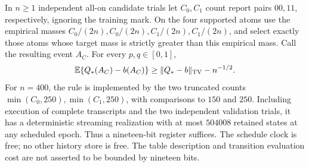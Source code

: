 \begin{lemma}
\label{lem:v19-counter}
In $n\ge1$ independent all-on candidate trials let $C_0,C_1$ count report
pairs $00,11$, respectively, ignoring the training mark. On the four
supported atoms use the empirical masses
$C_0/(2n),C_0/(2n),C_1/(2n),C_1/(2n)$, and select exactly those atoms
whose target mass is strictly greater than this empirical mass. Call the
resulting event $A_C$. For every $p,q\in[0,1]$,
\begin{equation}\label{eq:v19-countregret}
 \mathbb E\{Q_*(A_C)-b(A_C)\}\ge\|Q_*-b\|_{\rm TV}-n^{-1/2}.
\end{equation}
For $n=400$, the rule is implemented by the two truncated counts
$\min(C_0,250),\min(C_1,250)$, with comparisons to $150$ and $250$.
Including execution of complete transcripts and the two independent
validation trials, it has a deterministic streaming realization with at
most $504008$ retained states at any scheduled epoch. Thus a nineteen-bit
register suffices. The schedule clock is free; no other history store is
free. The table description and transition evaluation cost are not asserted
to be bounded by nineteen bits.
\end{lemma}
